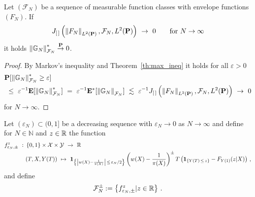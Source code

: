 \begin{lemma}
  \label{markov_max_lemma}
  Let $(\mathcal{F}_N)$ be a sequence of measurable function classes with envelope functions $(F_N)$.
  If
  \begin{gather}
    J_{[\, ]}
    \left( 
    \norm{F_N}_{ L^2(\P)}
    ,
    \mathcal{F}_N
    ,
     L^2(\P)
    \right)
    \ 
    \to
    \ 
    0
    \qquad
    \text{for}
    \ 
    N
    \to
    \infty
  \end{gather}
  it holds 
  $
  \left\lVert\mathbb{G}_N\right\rVert^*_{\mathcal{F}_N}\overset{\mathbf{P}}{\to}0
  $.
\end{lemma}
\begin{proof}
  By Markov's inequality and Theorem~\ref{th:max_ineq} it holds for all $\varepsilon>0$
  \begin{align*}
    &
    \P
    [
  \norm{\G_N}^*_{\mathcal{F}_N}
  \ge
  \varepsilon
    ]
    \\
    &
    \ 
    \le
    \ 
    \varepsilon^{-1}
    \E
    [
  \norm{\G_N}^*_{\mathcal{F}_N}
    ]
    \ 
    =
    \ 
    \varepsilon^{-1}
    \E^*
    [
  \norm{\G_N}_{\mathcal{F}_N}
    ]
    \ 
    \lesssim
    \ 
    \varepsilon^{-1}
    J_{[\, ]}
    \left( 
    \norm{F_N}_{ L^2(\P)}
    ,
    \mathcal{F}_N
    ,
     L^2(\P)
    \right)
    \ 
    \to
    \ 
    0
  \end{align*}
  for $N\to\infty$. 
\end{proof}
Let 
  $(\varepsilon_N)\subset(0,1]$ be a decreasing sequence with 
  $\varepsilon_N\to 0$ as $N\to\infty$ and define for
  $N\in\mathbb{N}$ and $z\in\mathbb{R}$ the function
 \begin{align*}
    f_{\varepsilon_N,\pm}^z
    \ 
    :
    \ 
    &
      \left\{ 0,1 \right\}
      \times
      \mathcal{X}
      \times
      \mathcal{Y}
    \ 
    \to
    \ 
    \R
    \\
    &
      (T,X,Y(T))
      \ 
      \mapsto
      \ 
      \mathbf{1}
      _
      {\left\{ 
          \left|
      w(X)-\frac{1}{\pi(X)}
          \right|
          \,
          \le
          \,
          \varepsilon_N/2
      \right\}}
      \left( 
      w(X)-\frac{1}{\pi(X)}
      \right)
      ^{\pm}
      T
      \left( 
        \mathbf{1}
        _{\left\{  Y(T)\,\le\,z \right\}}
        -
        F_{Y(1)}(z|X)
      \right)
      \,,
  \end{align*}
  and define 
  \begin{gather*}
    \mathcal{F}_N^\pm
    :=
    \left\{ 
    f_{\varepsilon_N,\pm}^z
    |
    z\in\mathbb{R}
    \right\}
    \,.
  \end{gather*}
